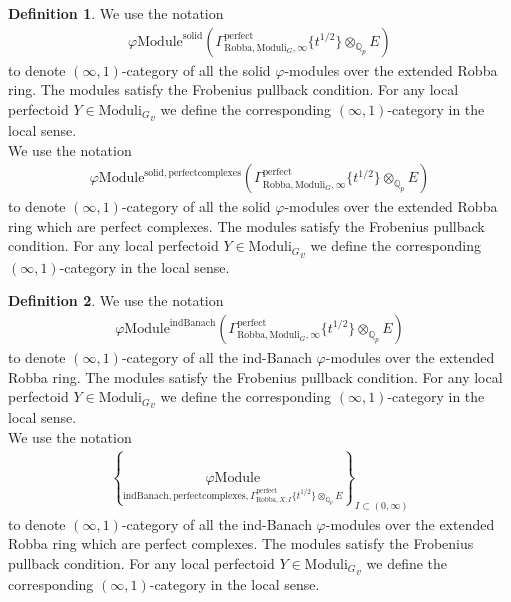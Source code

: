 \documentclass[12pt]{book}
\theoremstyle{definition}
\newtheorem{definition}{Definition}
\begin{document}
\begin{definition}
We use the notation
\begin{align}
\varphi\mathrm{Module}^{\mathrm{solid}}(\Gamma^\text{perfect}_{\text{Robba},{\mathrm{Moduli}_G},\infty}\{t^{1/2}\}\otimes_{\mathbb{Q}_p}E)
\end{align}
to denote $(\infty,1)$-category of all the solid $\varphi$-modules over the extended Robba ring. The modules satisfy the Frobenius pullback condition. For any local perfectoid $Y\in {\mathrm{Moduli}_G}_v$ we define the corresponding $(\infty,1)$-category in the local sense.\\
We use the notation
\begin{align}
\varphi\mathrm{Module}^{\mathrm{solid,perfectcomplexes}}(\Gamma^\text{perfect}_{\text{Robba},{\mathrm{Moduli}_G},\infty}\{t^{1/2}\}\otimes_{\mathbb{Q}_p}E)
\end{align}
to denote $(\infty,1)$-category of all the solid $\varphi$-modules over the extended Robba ring which are perfect complexes. The modules satisfy the Frobenius pullback condition. For any local perfectoid $Y\in {\mathrm{Moduli}_G}_v$ we define the corresponding $(\infty,1)$-category in the local sense. 

\end{definition}


\begin{definition}
We use the notation
\begin{align}
\varphi\mathrm{Module}^{\mathrm{indBanach}}(\Gamma^\text{perfect}_{\text{Robba},{\mathrm{Moduli}_G},\infty}\{t^{1/2}\}\otimes_{\mathbb{Q}_p}E)
\end{align}
to denote $(\infty,1)$-category of all the ind-Banach $\varphi$-modules over the extended Robba ring. The modules satisfy the Frobenius pullback condition. For any local perfectoid $Y\in {\mathrm{Moduli}_G}_v$ we define the corresponding $(\infty,1)$-category in the local sense.\\
We use the notation
\begin{align}
\left\{\underset{\mathrm{indBanach,perfectcomplexes},\Gamma^\text{perfect}_{\text{Robba},X,I}\{t^{1/2}\}\otimes_{\mathbb{Q}_p}E}{\varphi\mathrm{Module}}\right\}_{I\subset (0,\infty)}
\end{align}
to denote $(\infty,1)$-category of all the ind-Banach $\varphi$-modules over the extended Robba ring which are perfect complexes. The modules satisfy the Frobenius pullback condition. For any local perfectoid $Y\in {\mathrm{Moduli}_G}_v$ we define the corresponding $(\infty,1)$-category in the local sense. 

\end{definition}
\end{document}
